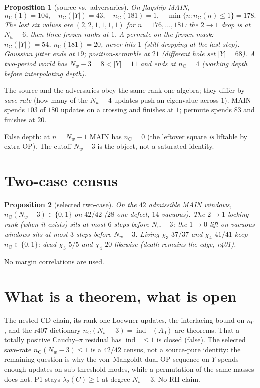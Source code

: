 \documentclass[11pt]{article}
\newtheorem{prop}{Proposition}
\theoremstyle{remark}
\newcommand{\indm}{\operatorname{ind}_{-}}
\newcommand{\nC}{n_{\mathrm{C}}}
\begin{document}
\begin{prop}[source vs.\ adversaries]\label{prop:curve}
On flagship MAIN,
\[
\nC(1)=104,\quad
\nC(|Y|)=43,\quad
\nC(181)=1,\quad
\min\{n:\nC(n)\le 1\}=178.
\]
The last six values are $(2,2,1,1,1,1)$ for
$n=176,\ldots,181$: the $2\to 1$ drop is at $N_w-6$,
then three frozen ranks at $1$.
$\Lambda$-permute on the frozen mask: $\nC(|Y|)=54$,
$\nC(181)=20$, never hits $1$ (still dropping at the
last step).
Gaussian jitter ends at $19$; position-scramble at $21$
(different hole set $|Y|=68$).
A two-period world has $N_w-3=8<|Y|=11$ and ends at
$\nC=4$ (working depth before interpolating depth).
\end{prop}

The source and the adversaries obey the same rank-one
algebra; they differ by \emph{save rate} (how many of
the $N_w-4$ updates push an eigenvalue across $1$).
MAIN spends $103$ of $180$ updates on a crossing and
finishes at $1$; permute spends $83$ and finishes at $20$.

False depth: at $n=N_w-1$ MAIN has $\nC=0$ (the leftover
square \emph{is} liftable by extra OP).
The cutoff $N_w-3$ is the object, not a saturated
identity.

\section{Two-case census}\label{sec:census}

\begin{prop}[selected two-case]\label{prop:census}
On the $42$ admissible MAIN windows,
$\nC(N_w-3)\in\{0,1\}$ on $42/42$ ($28$ one-defect,
$14$ vacuous).
The $2\to 1$ locking rank (when it exists) sits at most
$6$ steps before $N_w-3$; the $1\to 0$ lift on vacuous
windows sits at most $3$ steps before $N_w-3$.
Living $\chi_3$ $37/37$ and $\chi_4$ $41/41$ keep
$\nC\in\{0,1\}$; dead $\chi_3$ $5/5$ and $\chi_4$-$20$
likewise (death remains the edge, r401).
\end{prop}

No margin correlations are used.

\section{What is a theorem, what is open}\label{sec:honest}

The nested CD chain, its rank-one Loewner updates, the
interlacing bound on $\nC$, and the r407 dictionary
$\nC(N_w-3)=\indm(A_0)$ are theorems.
That a totally positive Cauchy--$\pi$ residual has
$\indm\le 1$ is closed (false).
The selected save-rate $\nC(N_w-3)\le 1$ is a
$42/42$ census, not a source-pure identity: the
remaining question is why the von~Mangoldt dual OP
sequence on $Y$ spends enough updates on sub-threshold
modes, while a permutation of the same masses does not.
P1 stays $\lambda_2(C)\ge 1$ at degree $N_w-3$.
No RH claim.
\end{document}
